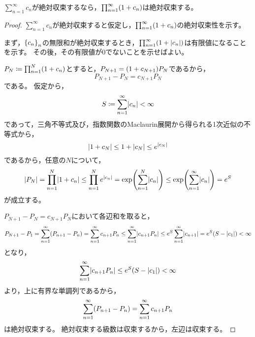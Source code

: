 \documentclass[a4paper,draft]{ltjsarticle}
\begin{document}
\begin{thm}[無限和と無限積の絶対収束]\label{thm:RiemannZeta-infsum-infprod-converge}
    $\sum_{n=1}^\infty c_n$が絶対収束するなら，$\prod_{n=1}^\infty \pare{1+c_n}$は絶対収束する。
    \begin{proof}
        $\sum_{n=1}^\infty c_n$が絶対収束すると仮定し，$\prod_{n=1}^\infty \pare{1+c_n}$の絶対収束性を示す。

        まず，$\seq{c_n}{n}$の無限和が絶対収束するとき，$\prod_{n=1}^\infty \pare{1+\abs{c_n}}$は有限値になることを示す。
        その後，その有限値が$0$でないことを示せばよい。

        $P_N\coloneqq \prod_{n=1}^N \pare{1+c_n}$とすると，$P_{N+1} = \pare{1+c_{N+1}}P_N$であるから，
        \begin{equation}
            P_{N+1}-P_N = c_{N+1}P_N
        \end{equation}
        である。
        仮定から，
        \begin{equation}
            S\coloneqq \sum_{n=1}^\infty \abs{c_n} <\infty
        \end{equation}
        であって，三角不等式及び，指数関数のMaclaurin展開から得られる1次近似の不等式から，
        \begin{equation}
            \abs{1+c_N} \leq 1+ \abs{c_N} \leq e^{\abs{c_N}}
        \end{equation}
        であるから，任意の$N$について，
        \begin{equation}
            \abs{P_N} = \prod_{n=1}^N \abs{1+c_n} \leq \prod_{n=1}^N e^{\abs{c_n}}=\fun{\exp}{\sum_{n=1}^N \abs{c_n}}\leq \fun{\exp}{\sum_{n=1}^\infty \abs{c_n}}= e^{S}
        \end{equation}
        が成立する。

        $P_{N+1}-P_N=c_{N+1}P_N$において各辺和を取ると，
        \begin{equation}
            P_{N+1}-P_1=\sum_{n=1}^\infty\pare{P_{n+1}-P_n}=\sum_{n=1}^\infty c_{n+1}P_n \leq\sum_{n=1}^\infty\abs{c_{n+1}P_n}\leq e^{S}\sum_{n=1}^\infty \abs{c_{n+1}}=e^{S}\pare{S-\abs{c_1}}<\infty
        \end{equation}
        となり，
        \begin{equation}
            \sum_{n=1}^\infty\abs{c_{n+1}P_n}\leq e^{S}\pare{S-\abs{c_1}}<\infty
        \end{equation}
        より，上に有界な単調列であるから，
        \begin{equation}
            \sum_{n=1}^\infty\pare{P_{n+1}-P_n}=\sum_{n=1}^\infty c_{n+1}P_n 
        \end{equation}
        は絶対収束する。
        絶対収束する級数は収束するから，左辺は収束する。


\end{proof}
\end{thm}
\end{document}
